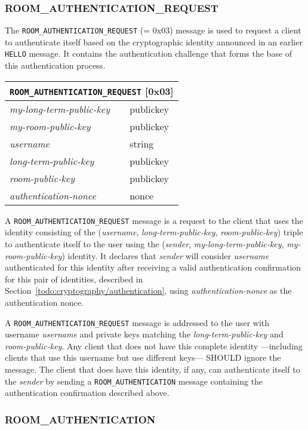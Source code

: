 \documentclass{article}
\def\message#1{\texttt{#1}}
\def\field#1{\textit{#1}}
\newenvironment{basicmessage}[2]{
\newcommand{\messagefield}[2]{
\field{##1} & \textsf{##2} \\
\hline
}
\begin{tabular}{|l|l|}
\hline
\multicolumn{2}{|c|}{\message{#1} [#2]} \\
\hline
\hline
}{
\end{tabular}
}
\begin{document}
\subsubsection{ROOM\_AUTHENTICATION\_REQUEST}
\label{sec:messages/room-authentication-request}

The \message{ROOM\_AUTHENTICATION\_REQUEST} (= 0x03) message is used to request a client to authenticate itself based on the cryptographic identity announced in an earlier \message{HELLO} message.
It contains the authentication challenge that forms the base of this authentication process.

\begin{basicmessage}{ROOM\_AUTHENTICATION\_REQUEST}{0x03}
\messagefield{my-long-term-public-key}{publickey}
\messagefield{my-room-public-key}{publickey}
\messagefield{username}{string}
\messagefield{long-term-public-key}{publickey}
\messagefield{room-public-key}{publickey}
\messagefield{authentication-nonce}{nonce}
\end{basicmessage}

A \message{ROOM\_AUTHENTICATION\_REQUEST} message is a request to the client that uses the identity consisting of the (\field{username}, \field{long-term-public-key}, \field{room-public-key}) triple to authenticate itself to the user using the (\field{sender}, \field{my-long-term-public-key}, \field{my-room-public-key}) identity.
It declares that \field{sender} will consider \field{username} authenticated for this identity after receiving a valid authentication confirmation for this pair of identities, described in Section~\ref{todo:cryptography/authentication}, using \field{authentication-nonce} as the authentication nonce.

A \message{ROOM\_AUTHENTICATION\_REQUEST} message is addressed to the user with username \field{username} and private keys matching the \field{long-term-public-key} and \field{room-public-key}.
Any client that does not have this complete identity ---including clients that use this username but use different keys--- SHOULD ignore the message.
The client that does have this identity, if any, can authenticate itself to the \field{sender} by sending a \message{ROOM\_AUTHENTICATION} message containing the authentication confirmation described above.


\subsubsection{ROOM\_AUTHENTICATION}
\label{sec:messages/room-authentication}
\end{document}
